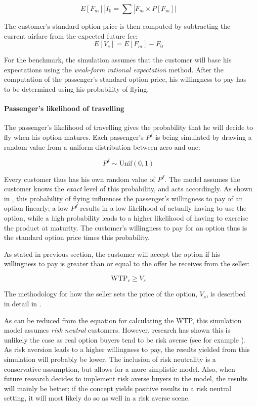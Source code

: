 $$ E[F_m] | I_0 = \sum |F_m \times P[F_m]| $$

The customer's standard option price is then computed by subtracting the current airfare from the expected future fee:
$$ E[V_c] = E[F_m] - F_0 $$

For the benchmark, the simulation assumes that the customer will base his expectations using the \emph{weak-form rational expectation} method. After the computation of the passenger's standard option price, his willingness to pay has to be determined using his probability of flying.

\paragraph{Passenger's likelihood of travelling}
The passenger's likelihood of travelling gives the probability that he will decide to fly when his option matures. Each passenger's $P^f$ is being simulated by drawing a random value from a uniform distribution between zero and one:

$$ P^f \sim \mbox{Unif}(0, 1)$$

Every customer thus has his own random value of $P^f$. The model assumes the customer knows the \emph{exact} level of this probability, and acts accordingly. As shown in , this probability of flying influences the passenger's willingness to pay of an option linearly; a low $P^f$ results in a low likelihood of actually having to use the option, while a high probability leads to a higher likelihood of having to exercise the product at maturity. The customer's willingness to pay for an option thus is the standard option price times this probability.

As stated in previous section, the customer will accept the option if his willingness to pay is greater than or equal to the offer he receives from the seller:

$$ \mbox{WTP}_c \ge V_s $$

The methodology for how the seller sets the price of the option, $V_s$, is described in detail in .

As can be reduced from the equation for calculating the WTP, this simulation model assumes \emph{risk neutral} customers. However, research has shown this is unlikely the case as real option buyers tend to be risk averse (see for example \cite{miller2004empirical}). As risk aversion leads to a higher willingness to pay, the results yielded from this simulation will probably be lower. The inclusion of risk neutrality is a conservative assumption, but allows for a more simplistic model. Also, when future research decides to implement risk averse buyers in the model, the results will mainly be better; if the concept yields positive results in a risk neutral setting, it will most likely do so as well in a risk averse scene.


